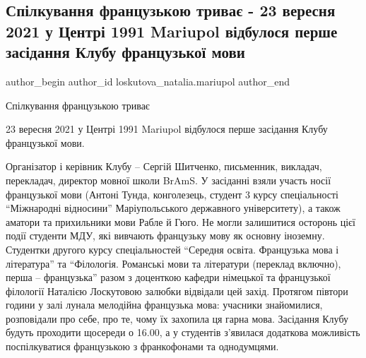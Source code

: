  
 
 
 
 

\subsection{Спілкування французькою триває - 23 вересня 2021 у Центрі 1991 Mariupol відбулося перше засідання Клубу французької мови}
\label{sec:23_09_2021.fb.loskutova_natalia.mariupol.1.pershe_zasidannja_klubu_franc_movy}

\ifcmt
 author_begin
   author_id loskutova_natalia.mariupol
 author_end
\fi

Спілкування французькою триває

23 вересня 2021 у Центрі 1991 Mariupol відбулося перше засідання Клубу
французької мови.


Організатор і керівник Клубу – Сергій Шитченко, письменник,
викладач, перекладач, директор мовної школи BrAmS. У засіданні взяли участь
носії французької мови (Антоні Тунда, конголезець, студент 3 курсу
спеціальності \enquote{Міжнародні відносини} Маріупольського державного університету),
а також аматори та прихильники мови Рабле й Гюго. Не могли залишитися осторонь
цієї події студенти МДУ, які вивчають французьку мову як основну іноземну.
Студентки другого курсу спеціальностей \enquote{Середня освіта. Французька мова і
література} та \enquote{Філологія. Романські мови та літератури (переклад включно),
перша – французька} разом з доценткою кафедри німецької та французької
філології Наталією Лоскутовою залюбки відвідали цей захід. Протягом півтори
години у залі лунала мелодійна французька мова: учасники знайомилися,
розповідали про себе, про те, чому їх захопила ця гарна мова. Засідання Клубу
будуть проходити щосереди о 16.00, а у студентів з'явилася додаткова можливість
поспілкуватися французькою з франкофонами та однодумцями.

